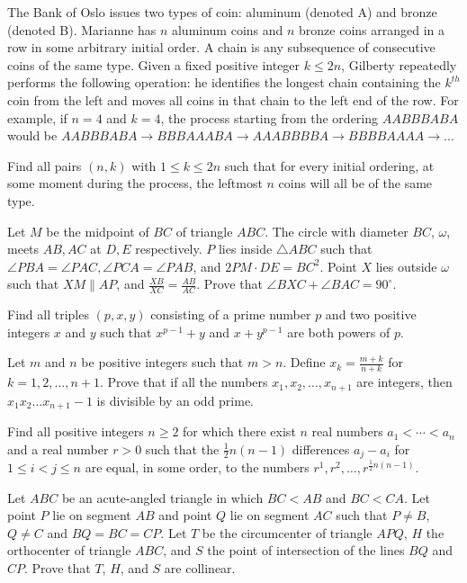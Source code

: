 \documentclass[11pt]{scrartcl}
\begin{document}
\begin{problem}[587866144613888]
The Bank of Oslo issues two types of coin: aluminum (denoted A) and bronze (denoted B). Marianne has $n$ aluminum coins and $n$ bronze coins arranged in a row in some arbitrary initial order. A chain is any subsequence of consecutive coins of the same type. Given a fixed positive integer $k \leq 2n$, Gilberty repeatedly performs the following operation: he identifies the longest chain containing the $k^{th}$ coin from the left and moves all coins in that chain to the left end of the row. For example, if $n=4$ and $k=4$, the process starting from the ordering $AABBBABA$ would be $AABBBABA \to BBBAAABA \to AAABBBBA \to BBBBAAAA \to ...$

Find all pairs $(n,k)$ with $1 \leq k \leq 2n$ such that for every initial ordering, at some moment during the process, the leftmost $n$ coins will all be of the same type.
\end{problem}
\begin{problem}[591652153716935]
	Let $M$ be the midpoint of $BC$ of triangle $ABC$. The circle with diameter $BC$, $\omega$, meets $AB,AC$ at $D,E$ respectively. $P$ lies inside $\triangle ABC$ such that $\angle PBA=\angle PAC, \angle PCA=\angle PAB$, and $2PM\cdot DE=BC^2$. Point $X$ lies outside $\omega$ such that $XM\parallel AP$, and $\frac{XB}{XC}=\frac{AB}{AC}$. Prove that $\angle BXC +\angle BAC=90^{\circ}$.
\end{problem}
\begin{problem}[592243963244567]
	Find all triples $(p, x, y)$ consisting of a prime number $p$ and two positive integers $x$ and $y$ such that $x^{p -1} + y$ and $x + y^ {p -1}$ are both powers of $p$.
\end{problem}
\begin{problem}[596300332016249]
	Let $m$ and $n$ be positive integers such that $m>n$. Define $x_k=\frac{m+k}{n+k}$ for $k=1,2,\ldots,n+1$. Prove that if all the numbers $x_1,x_2,\ldots,x_{n+1}$ are integers, then $x_1x_2\ldots x_{n+1}-1$ is divisible by an odd prime.
\end{problem}
\begin{problem}[596902679696332]
Find all positive integers $n \geqslant 2$ for which there exist $n$ real numbers $a_1<\cdots< a_n$ and a real number $r>0$ such that the $\tfrac{1}{2}n(n-1)$ differences $a_j-a_i$ for $1 \leqslant i<j \leqslant n$ are equal, in some order, to the numbers $r^1,r^2,\ldots,r^{\frac{1}{2}n(n-1)}$.
\end{problem}
\begin{problem}[597832355221478]
Let $ABC$ be an acute-angled triangle in which $BC<AB$ and $BC<CA$. Let point $P$ lie on segment $AB$ and point $Q$ lie on segment $AC$ such that $P \neq B$, $Q \neq C$ and $BQ = BC = CP$. Let $T$ be the circumcenter of triangle $APQ$, $H$ the orthocenter of triangle $ABC$, and $S$ the point of intersection of the lines $BQ$ and $CP$. Prove that $T$, $H$, and $S$ are collinear.
\end{problem}
\end{document}

